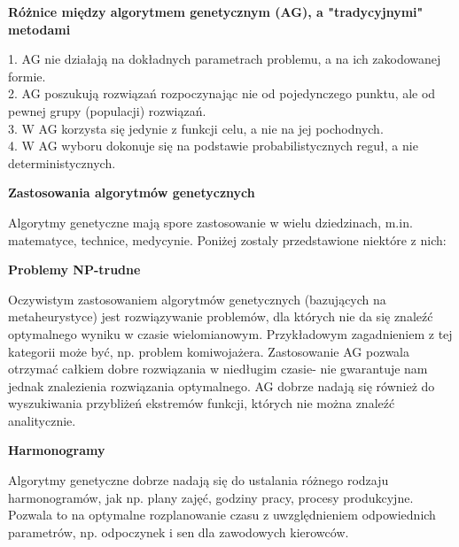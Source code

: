 \documentclass[a4paper, twoside, 12pt, justified]{article}
\begin{document}
	\newpage
	\begin{large}
		\begin{center}
			\textbf{Różnice między algorytmem genetycznym (AG), a "tradycyjnymi" metodami}
		\end{center}
	\end{large}

	
	\hspace{-6mm}1. AG nie działają na dokładnych parametrach problemu, a na ich zakodowanej formie.\\
	2. AG poszukują rozwiązań rozpoczynając nie od pojedynczego punktu, ale od pewnej grupy (populacji) rozwiązań.\\
	3. W AG korzysta się jedynie z funkcji celu, a nie na jej pochodnych.\\
	4. W AG wyboru dokonuje się na podstawie probabilistycznych reguł, a nie deterministycznych.\\
	
	
	
	
	
	\begin{large}
		\begin{center}
			\textbf{Zastosowania algorytmów genetycznych}
		\end{center}
	\end{large}
	Algorytmy genetyczne mają spore zastosowanie w wielu dziedzinach, m.in. matematyce, technice, medycynie. Poniżej zostaly przedstawione niektóre z nich:
	
	\begin{center}
		\textbf{Problemy NP-trudne}
	\end{center}	
	Oczywistym zastosowaniem algorytmów genetycznych (bazujących na metaheurystyce) jest rozwiązywanie problemów, dla których nie da się znaleźć optymalnego wyniku w czasie wielomianowym. Przykładowym zagadnieniem z tej kategorii może być, np. problem komiwojażera. Zastosowanie AG pozwala otrzymać całkiem dobre rozwiązania w niedługim czasie- nie gwarantuje nam jednak znalezienia rozwiązania optymalnego. AG dobrze nadają się również do wyszukiwania przybliżeń ekstremów funkcji, których nie można znaleźć analitycznie.\\

	
	\begin{center}
		\textbf{Harmonogramy}
	\end{center}
	
	Algorytmy genetyczne dobrze nadają się do ustalania różnego rodzaju harmonogramów, jak np. plany zajęć, godziny pracy, procesy produkcyjne. Pozwala to na optymalne rozplanowanie czasu z uwzględnieniem odpowiednich parametrów, np. odpoczynek i sen dla zawodowych kierowców.  
	
\end{document}
